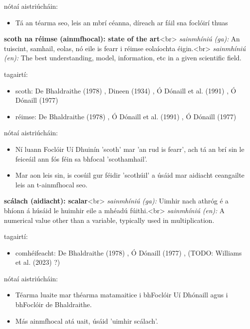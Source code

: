 \documentclass{article}
\begin{document}
nótaí aistriúcháin:
\begin{itemize}
	\item Tá an téarma seo, leis an mbrí céanna, díreach ar fáil sna foclóirí thuas
\end{itemize}


\textbf{scoth na réimse (ainmfhocal): state of the art}<br>
\textit{sainmhíniú (ga):} An tuiscint, samhail, eolas, nó eile is fearr i réimse eolaíochta éigin.<br>
\textit{sainmhíniú (en):} The best understanding, model, information, etc in a given scientific field.

tagairtí:
\begin{itemize}
	\item scoth: De Bhaldraithe (1978) \cite{de-bhaldraithe}, Dineen (1934) \cite{dineen}, Ó Dónaill et al. (1991) \cite{focloir-beag}, Ó Dónaill (1977) \cite{odonaill}
	\item réimse: De Bhaldraithe (1978) \cite{de-bhaldraithe}, Ó Dónaill et al. (1991) \cite{focloir-beag}, Ó Dónaill (1977) \cite{odonaill}
\end{itemize}

nótaí aistriúcháin:
\begin{itemize}
	\item Ní luann Foclóir Uí Dhuinín 'scoth' mar 'an rud is fearr', ach tá an brí sin le feiceáil ann fós féin sa bhfocal 'scothamhail'.
	\item Mar aon leis sin, is cosúil gur féidir 'scothúil' a úsáid mar aidiacht ceangailte leis an t-ainmfhocal seo.
\end{itemize}


\textbf{scálach (aidiacht): scalar}<br>
\textit{sainmhíniú (ga):} Uimhir nach athróg é a bhíonn á húsáid le huimhir eile a mhéadú fúithi.<br>
\textit{sainmhíniú (en):} A numerical value other than a variable, typically used in multiplication.

tagairtí:
\begin{itemize}
	\item comhéifeacht: De Bhaldraithe (1978) \cite{de-bhaldraithe}, Ó Dónaill (1977) \cite{odonaill}, (TODO: Williams et al. (2023) \cite{storchiste}?)
\end{itemize}

nótaí aistriúcháin:
\begin{itemize}
	\item Téarma luaite mar théarma matamaitice i bhFoclóir Uí Dhónaill agus i bhFoclóir de Bhaldraithe.
	\item Más ainmfhocal atá uait, úsáid 'uimhir scálach'.
\end{itemize}
\end{document}
